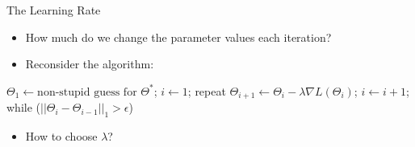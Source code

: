 \documentclass[aspectratio=169]{beamer}
\begin{document}
\begin{frame}[fragile]{The Learning Rate}

\begin{itemize}
\item How much do we change the parameter values each iteration?
\item Reconsider the algorithm:
\end{itemize}
\begin{SQL}
$\Theta_1 \leftarrow \textrm{non-stupid guess for } \Theta^*$;
$i \leftarrow 1$;
repeat {
  $\Theta_{i + 1} \leftarrow \Theta_{i} - \lambda \nabla L (\Theta_{i})$;
  $i \leftarrow i + 1$;
} while ($||\Theta_{i} - \Theta_{i - 1}||_1 > \epsilon$)
\end{SQL} 

\begin{itemize}
\item How to choose $\lambda$?
\end{itemize}

\end{frame}
\end{document}
